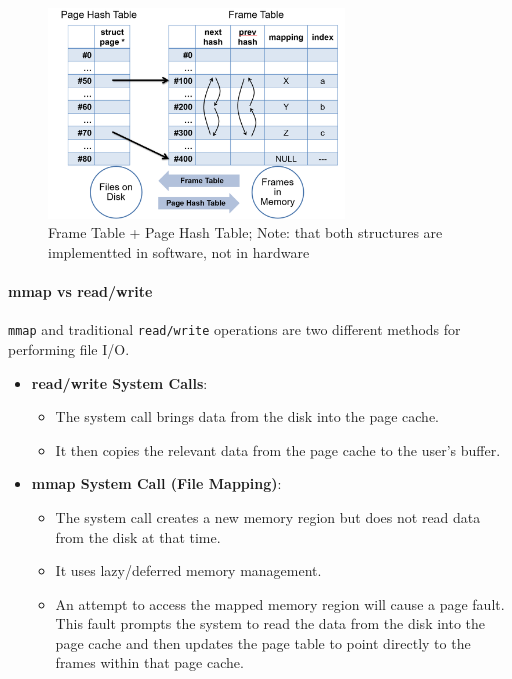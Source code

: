 \documentclass[openany,12pt]{book}
\begin{document}
\begin{figure}[h!]
\centering
\includegraphics[width=0.7\textwidth]{Frame-Table.png}
\caption{Frame Table + Page Hash Table; Note: that both structures are implementted in software, not in hardware}
\label{fig:frame-table}
\end{figure}






\paragraph{mmap vs read/write} \texttt{mmap} and traditional \texttt{read/write} operations are two different methods for performing file I/O.

\begin{itemize}
    \item \textbf{read/write System Calls}:
    \begin{itemize}
        \item The system call brings data from the disk into the page cache.
        \item It then copies the relevant data from the page cache to the user's buffer.
    \end{itemize}

    \item \textbf{mmap System Call (File Mapping)}:
    \begin{itemize}
        \item The system call creates a new memory region but does not read data from the disk at that time.
        \item It uses lazy/deferred memory management.
        \item An attempt to access the mapped memory region will cause a page fault. This fault prompts the system to read the data from the disk into the page cache and then updates the page table to point directly to the frames within that page cache.
    \end{itemize}
\end{itemize}
\end{document}
